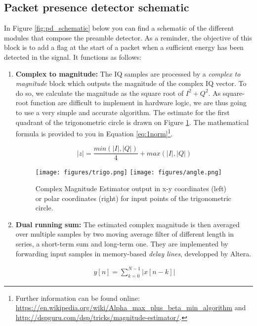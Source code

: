 \subsection{Packet presence detector schematic}
In Figure \ref{fig:pd_schematic} below you can find a schematic of the different modules that compose the preamble detector. As a reminder, the objective of this block is to add a flag at the start of a packet when a sufficient energy has been detected in the signal. It functions as follows:
\begin{enumerate}
    \item \textbf{Complex to magnitude: } The IQ samples are processed by a \textit{complex to magnitude} block which outputs the magnitude of the complex IQ vector.
    To do so, we calculate the magnitude as the square root of $I^2+Q^2$. As square-root function are difficult to implement in hardware logic, we are thus going to use a very simple and accurate algorithm. The estimate for the first quadrant of the trigonometric circle is drawn on Figure \ref{fig:cmplx2mag}. The mathematical formula is provided to you in Equation \ref{eq:1norm}\footnote{Further information can be found online: \url{https://en.wikipedia.org/wiki/Alpha_max_plus_beta_min_algorithm} and \url{http://dspguru.com/dsp/tricks/magnitude-estimator/}.}.

    \begin{equation}
        |z| = \frac{min(|I|,|Q|)}{4} + max(|I|,|Q|)
        \label{eq:1norm}
    \end{equation}
    
    \begin{figure}[h]
        \centering
        \texttt{[image: figures/trigo.png]}
        \texttt{[image: figures/angle.png]}
        \caption{Complex Magnitude Estimator output in x-y coordinates (left) or polar coordinates (right) for input points of the trigonometric circle.}
        \label{fig:cmplx2mag}
    \end{figure}

    \item \textbf{Dual running sum: } The estimated complex magnitude is then averaged over multiple samples by two moving average filter of different length in series, a short-term sum and long-term one. They are implemented by forwarding input samples in  memory-based \textit{delay lines}, developped by Altera. 

    \begin{align}
            y[n] = \sum_{k=0}^{N-1}\left|x[n-k]\right|
    \end{align}


\end{enumerate}
